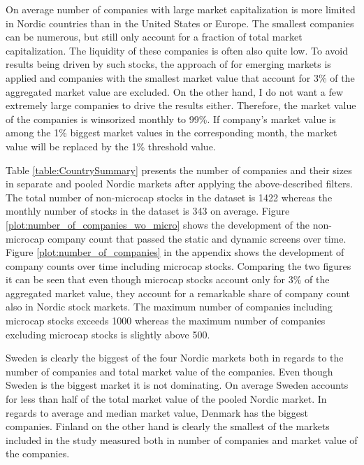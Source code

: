 \documentclass[12pt]{article}
\begin{document}
On average number of companies with large market capitalization is more limited in Nordic countries than in the United States or Europe. The smallest companies can be numerous, but still only account for a fraction of total market capitalization. The liquidity of these companies is often also quite low. To avoid results being driven by such stocks, the approach of \citet{HANAUER2023} for emerging markets is applied and companies with the smallest market value that account for 3\% of the aggregated market value are excluded. On the other hand, I do not want a few extremely large companies to drive the results either. Therefore, the market value of the companies is winsorized monthly to 99\%. If company's market value is among the 1\% biggest market values in the corresponding month, the market value will be replaced by the 1\% threshold value.\footnotemark {} \par

Table \ref{table:CountrySummary} presents the number of companies and their sizes in separate and pooled Nordic markets after applying the above-described filters. The total number of non-microcap stocks in the dataset is 1422 whereas the monthly number of stocks in the dataset is 343 on average. Figure \ref{plot:number_of_companies_wo_micro} shows the development of the non-microcap company count that passed the static and dynamic screens over time. Figure \ref{plot:number_of_companies} in the appendix shows the development of company counts over time including microcap stocks. Comparing the two figures it can be seen that even though microcap stocks account only for 3\% of the aggregated market value, they account for a remarkable share of company count also in Nordic stock markets. The maximum number of companies including microcap stocks exceeds 1000 whereas the maximum number of companies excluding microcap stocks is slightly above 500. \par

Sweden is clearly the biggest of the four Nordic markets both in regards to the number of companies and total market value of the companies. Even though Sweden is the biggest market it is not dominating. On average Sweden accounts for less than half of the total market value of the pooled Nordic market. In regards to average and median market value, Denmark has the biggest companies. Finland on the other hand is clearly the smallest of the markets included in the study measured both in number of companies and market value of the companies. \par
\end{document}
